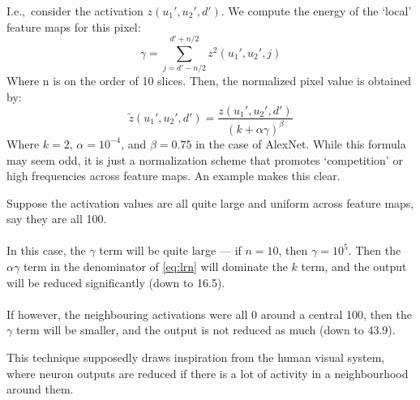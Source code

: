       I.e.,\ consider the activation $z(u_1',u_2',d')$. We compute the energy of the
      `local' feature maps for this pixel:
      \begin{equation}
        \gamma = \sum_{j=d' - n/2}^{d' + n/2} z^2(u_1',u_2',j)
      \end{equation}
      Where n is on the order of 10 slices. 
      Then, the normalized pixel value is obtained by:
      \begin{equation}
        \tilde{z}{(u_1',u_2',d')} = \frac{z(u_1',u_2',d')}{{(k + \alpha
        \gamma)}^\beta} \label{eq:lrn}
      \end{equation}
      Where $k=2$, $\alpha=10^{-4}$, and $\beta = 0.75$ in the case of AlexNet.
      While this formula may seem odd, it is just a normalization scheme that
      promotes `competition' or high frequencies across feature maps. An
      example makes this clear. 
      \begin{exmp}
        Suppose the activation values are all quite large and uniform across
        feature maps, say they are all 100.\\\\ 
        In this case, the $\gamma$ term
        will be quite large --- if $n=10$, then $\gamma=10^5$. Then the
        $\alpha\gamma$ term in the denominator of \autoref{eq:lrn} will
        dominate the $k$ term, and the output will be reduced significantly
        (down to 16.5). \\\\
				If however, the neighbouring activations were all
        0 around a central 100, then the $\gamma$ term will be smaller, and the
        output is not reduced as much (down to 43.9).
      \end{exmp}

      This technique supposedly draws inspiration from the human visual system,
      where neuron outputs are reduced if there is a lot of activity in
      a neighbourhood around them.

